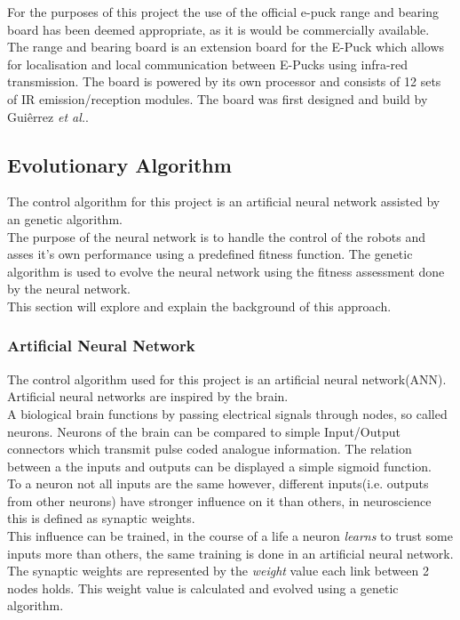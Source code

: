 For the purposes of this project the use of the official e-puck range and bearing board has been deemed appropriate, as it is would be commercially available.\\
The range and bearing board is an extension board for the E-Puck which allows for localisation and local communication between E-Pucks using infra-red transmission. 
The board is powered by its own processor and consists of 12 sets of IR emission/reception modules. 
The board was first designed and build by Guiêrrez \textit{et al.}\cite{Gutierrez}. 

\subsection{Evolutionary Algorithm}
The control algorithm for this project is an artificial neural network assisted by an genetic algorithm.\\
The purpose of the neural network is to handle the control of the robots and asses it's own performance using a predefined fitness function. 
The genetic algorithm is used to evolve the neural network using the fitness assessment done by the neural network. \\
This section will explore and explain the background of this approach.

\subsubsection{Artificial Neural Network}
The control algorithm used for this project is an artificial neural network(ANN).
Artificial neural networks are inspired by the brain. \\
A biological brain functions by passing electrical signals through nodes, so called neurons. Neurons of the brain can be compared to simple Input/Output connectors which transmit pulse coded analogue information. The relation between a the inputs and outputs can be displayed a simple sigmoid function\cite{Hopfield}.\\
To a neuron not all inputs are the same however, different inputs(i.e. outputs from other neurons) have stronger influence on it than others, in neuroscience this is defined as synaptic weights. \\
This influence can be trained, in the course of a life a neuron \textit{learns} to trust some inputs more than others, the same training is done in an artificial neural network. The synaptic weights are represented by the \textit{weight} value each link between 2 nodes holds. This weight value is calculated and evolved using a genetic algorithm. 

